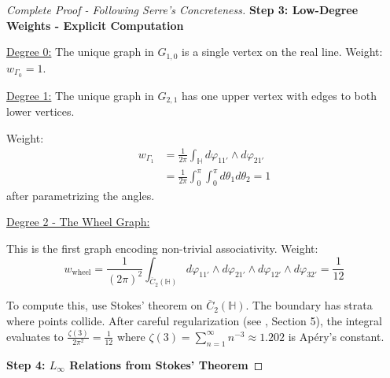 \begin{proof}[Complete Proof - Following Serre's Concreteness]
\textbf{Step 3: Low-Degree Weights - Explicit Computation}

\underline{Degree 0:} The unique graph in $G_{1,0}$ is a single vertex on the real line. Weight: $w_{\Gamma_0} = 1$.

\underline{Degree 1:} The unique graph in $G_{2,1}$ has one upper vertex with edges to both lower vertices.
\begin{center}
\end{center}

Weight:
\begin{align}
w_{\Gamma_1} &= \frac{1}{2\pi} \int_{\mathbb{H}} d\varphi_{11'} \wedge d\varphi_{21'} \\
&= \frac{1}{2\pi} \int_0^\pi \int_0^\pi d\theta_1 d\theta_2 = 1
\end{align}
after parametrizing the angles.

\underline{Degree 2 - The Wheel Graph:}
\begin{center}
\end{center}

This is the first graph encoding non-trivial associativity. Weight:
$$w_{\text{wheel}} = \frac{1}{(2\pi)^2} \int_{\overline{C}_2(\mathbb{H})} d\varphi_{11'} \wedge d\varphi_{21'} \wedge d\varphi_{12'} \wedge d\varphi_{32'} = \frac{1}{12}$$

\begin{computation}
To compute this, use Stokes' theorem on $\overline{C}_2(\mathbb{H})$. The boundary has strata where points collide. After careful regularization (see \cite{Kon94}, Section 5), the integral evaluates to $\frac{\zeta(3)}{2\pi^2} = \frac{1}{12}$ where $\zeta(3) = \sum_{n=1}^\infty n^{-3} \approx 1.202$ is Apéry's constant.
\end{computation}

\textbf{Step 4: $L_\infty$ Relations from Stokes' Theorem}


\end{proof}
